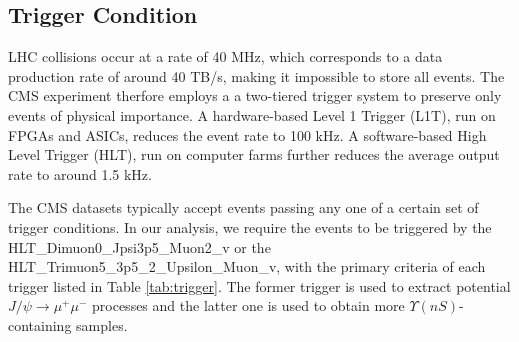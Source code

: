 \documentclass[10pt,twocolumn]{article}
\begin{document}
\subsection{Trigger Condition}

LHC collisions occur at a rate of 40 MHz, which corresponds to a data production rate of around 40 TB/s, making it impossible to store all events. The CMS experiment therfore employs a a two-tiered trigger system to preserve only events of physical importance. A hardware-based Level 1 Trigger (L1T), run on FPGAs and ASICs, reduces the event rate to 100 kHz. A software-based High Level Trigger (HLT), run on computer farms further reduces the average output rate to around 1.5 kHz.

The CMS datasets typically accept events passing any one of a certain set of trigger conditions. In our analysis, we require the events to be triggered by the HLT\_Dimuon0\_Jpsi3p5\_Muon2\_v or the HLT\_Trimuon5\_3p5\_2\_Upsilon\_Muon\_v, with the primary criteria of each trigger listed in Table \ref{tab:trigger}. The former trigger is used to extract potential $J/\psi\to\mu^+\mu^-$ processes and the latter one is used to obtain more $\Upsilon(nS)$-containing samples.
\end{document}
